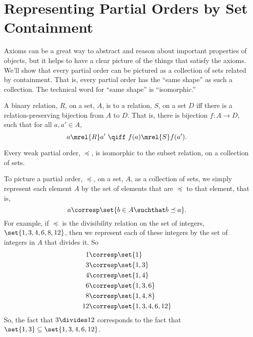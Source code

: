 \begin{problems}
\classproblems
{}

\homeworkproblems
{}

\end{problems}

\section{Representing Partial Orders by Set Containment}

Axioms can be a great way to abstract and reason about important
properties of objects, but it helps to have a clear picture of the things
that satisfy the axioms.  We'll show that every partial order can be
pictured as a collection of sets related by containment.  That is, every
partial order has the ``same shape'' as such a collection.  The technical
word for ``same shape'' is ``isomorphic.''

\begin{definition}\label{relation-isomorphism}
  A binary relation, $R$, on a set, $A$, is
   to a relation, $S$, on a set $D$ iff there is a
  relation-preserving bijection from $A$ to $D$.  That is, there is
  bijection $f:A \to D$, such that for all $a,a' \in A$,
  \[
  a \mrel{R} a'\ \qiff\ f(a) \mrel{S} f(a').
  \]
\end{definition}

\begin{theorem}
  Every weak partial order, $\preceq$, is isomorphic to the subset
  relation, on a collection of sets.
\end{theorem}

To picture a partial order, $\preceq$, on a set, $A$, as a collection of
sets, we simply represent each element $A$ by the set of elements
that are $\preceq$ to that element, that is,
\[
a \corresp \set{b \in A \suchthat b \preceq a}.
\]
For example, if $\preceq$ is the divisibility relation on the set of
integers, $\set{1,3,4,6,8,12}$, then we represent each of these integers
by the set of integers in $A$ that divides it.  So
\begin{align*}
1 & \corresp \set{1}\\
3 & \corresp \set{1,3}\\
4 & \corresp \set{1,4}\\
6 & \corresp \set{1,3,6}\\
8 & \corresp \set{1,4,8}\\
12 & \corresp \set{1,3,4,6, 12}
\end{align*}
So, the fact that $3 \divides 12$ corresponds to the fact that $\set{1,3}
\subseteq \set{1,3,4,6, 12}$.

